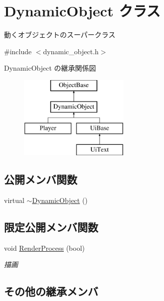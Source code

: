 \hypertarget{class_dynamic_object}{}\section{Dynamic\+Object クラス}
\label{class_dynamic_object}


動くオブジェクトのスーパークラス  




{\ttfamily \#include $<$dynamic\+\_\+object.\+h$>$}

Dynamic\+Object の継承関係図\begin{figure}[H]
\begin{center}
\leavevmode
\includegraphics[height=4.000000cm]{class_dynamic_object}
\end{center}
\end{figure}
\subsection*{公開メンバ関数}
\begin{DoxyCompactItemize}
\item 
virtual \mbox{\hyperlink{class_dynamic_object_af9141dddf35d338d5bae491cb0455583}{$\sim$\+Dynamic\+Object}} ()
\end{DoxyCompactItemize}
\subsection*{限定公開メンバ関数}
\begin{DoxyCompactItemize}
\item 
void \mbox{\hyperlink{class_dynamic_object_aa7488e1b4dfd7049447535d93d9d6783}{Render\+Process}} (bool)
\begin{DoxyCompactList}\small\item\em 描画 \end{DoxyCompactList}\end{DoxyCompactItemize}
\subsection*{その他の継承メンバ}


